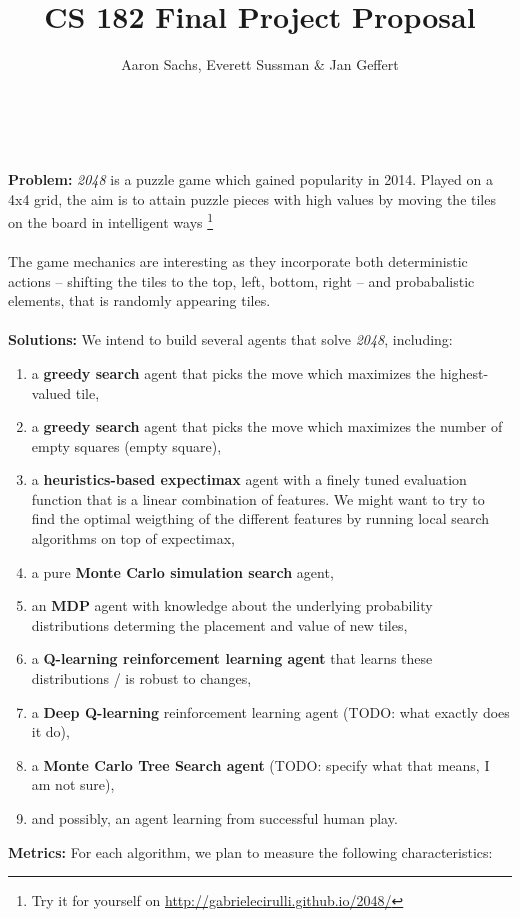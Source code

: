 \documentclass[12pt]{article}
\title{\vspace{-4cm}CS 182 Final Project Proposal}
\author{Aaron Sachs, Everett Sussman \& Jan Geffert}
\begin{document}
\maketitle
\noindent 
\\\\
\textbf{Problem: }\textit{2048} is a puzzle game which gained popularity in 2014. Played on a 4x4 grid, the aim is to attain puzzle pieces with high values by moving the tiles on the board in intelligent ways \footnote{Try it for yourself on \url{http://gabrielecirulli.github.io/2048/}}
\\\\
The game mechanics are interesting as they incorporate both deterministic actions – shifting the tiles to the top, left, bottom, right – and probabalistic elements, that is randomly appearing tiles. 
\\\\
\textbf{Solutions: }We intend to build several agents that solve \textit{2048}, including:
\begin{enumerate}
\itemsep-0.2em
	\item a \textbf{greedy search} agent that picks the move which maximizes the highest-valued tile,
	\item a \textbf{greedy search} agent that picks the move which maximizes the number of empty squares (empty square),
	\item a \textbf{heuristics-based expectimax} agent with a finely tuned evaluation function that is a linear combination of features. We might want to try to find the optimal weigthing of the different features by running local search algorithms on top of expectimax,
	\item a pure \textbf{Monte Carlo simulation search} agent,
	\item an \textbf{MDP} agent with knowledge about the underlying probability distributions determing the placement and value of new tiles,
	\item a \textbf{Q-learning reinforcement learning agent} that learns these distributions / is robust to changes,
	\item a \textbf{Deep Q-learning} reinforcement learning agent (TODO: what exactly does it do),
	\item a \textbf{Monte Carlo Tree Search agent} (TODO: specify what that means, I am not sure),
	\item and possibly, an agent learning from successful human play.
\end{enumerate}
\pagebreak
\noindent \textbf{Metrics: } For each algorithm, we plan to measure the following characteristics:
\end{document}
